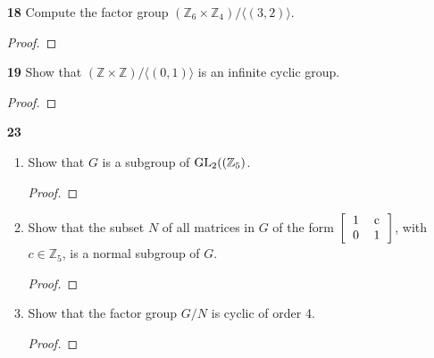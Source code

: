 \documentclass[paper=usletter, fontsize=12pt]{article}
\begin{document}
\begin{itemize}
\begin{enumerate}
            \item[\textbf{18}] Compute the factor group $(\mathbb{Z}_6 \times
            \mathbb{Z}_4)/ \langle(3,2)\rangle$.
            \begin{proof}
            \end{proof}

            \item[\textbf{19}] Show that $(\mathbb{Z} \times \mathbb{Z})/
            \langle(0,1)\rangle$ is an infinite cyclic group.
            \begin{proof}
            \end{proof}

            \item[\textbf{23}]
            \begin{enumerate}

                \item Show that $G$ is a subgroup of $\text{GL}_2((\mathbb{Z}_5)$.
                \begin{proof}
                \end{proof}

                \item Show that the subset $N$ of all matrices in $G$ of the form $\left[\begin{tabular}{cc}
                            1 & c \\
                            0 & 1
                \end{tabular}\right]$, with $c \in \mathbb{Z}_5$, is a normal
                subgroup of $G$.
                \begin{proof}
                \end{proof}

                \item Show that the factor group $G/N$ is cyclic of order 4.
                \begin{proof}
                \end{proof}

            \end{enumerate}

        \end{enumerate}


    \end{itemize}
\end{document}
